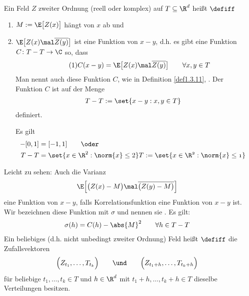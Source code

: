 \setcounter{satz}{12}
\begin{definition}\label{def1.3.13}
	Ein Feld $Z$ zweiter Ordnung (reell oder komplex) auf $T\subseteq\R^d$ heißt  $\defiff$ 
	\begin{enumerate}
		\item $\begin{aligned}
			M:=\E\big[Z(x)\big]
		\end{aligned}$ hängt  von $x$ ab und
		\item $\begin{aligned}
			\E\big[Z(x)\mal\overline{Z(y)}\big]
		\end{aligned}$ ist eine Funktion von $x-y$, d.h. es gibt eine Funktion $C\colon T-T\to\C$ so, dass
		\begin{align}\label{eq:def1.3.13_1}\tag{1}
			C(x-y)=\E\big[Z(x)\mal\overline{Z(y)}\big]\qquad\forall x,y\in T
		\end{align}
		Man nennt auch diese Funktion $C$, wie in Definition \ref{def1.3.11}, .
		Der Funktion $C$ ist auf der Menge 
		\begin{align*}
			T-T:=\set{x-y:x,y\in T}
		\end{align*}
		definiert.
		\begin{beisp}
			Es gilt
			\begin{align*}
				[0,1]-[0,1]&=[-1,1]\qquad\oder\\
				T-T&=\set{x\in\R^2:\norm{x}\leq 2}
				\mit T:=\set{x\in\R^2:\norm{x}\leq 1}
			\end{align*}
		\end{beisp}
	\end{enumerate}
	Leicht zu sehen: Auch die Varianz
	\begin{align*}
		\E\Big[\big(Z(x)-M\big)\mal\overline{\big(Z(y)-M\big)}\Big]
	\end{align*}
	eine Funktion von $x-y$, falls Korrelationsfunktion eine Funktion von $x-y$ ist.
	Wir bezeichnen diese Funktion mit $\sigma$ und nennen sie .
	Es gilt: 
	\begin{align*}
		\sigma(h)=C(h)-\abs{M}^2\qquad\forall h\in T-T
	\end{align*}
	Ein beliebiges (d.h. nicht unbedingt zweiter Ordnung) Feld heißt  $\defiff$ die Zufallsvektoren
	\begin{align*}
		\Big(Z_{t_1},\ldots,T_{t_k}\Big)
		\qquad\und\qquad
		\Big(Z_{t_1+h},\ldots,T_{t_k+h}\Big)
	\end{align*}
	für beliebige $t_1,\ldots,t_k\in T$ und $h\in\R^d$ mit $t_1+h,\ldots,t_k+h\in T$ dieselbe Verteilungen besitzen.
\end{definition}

